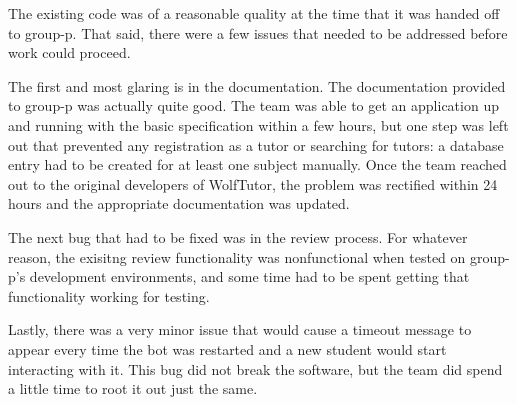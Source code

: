 The existing code was of a reasonable quality at the time that it was handed off
to group-p.  That said, there were a few issues that needed to be addressed
before work could proceed.

The first and most glaring is in the documentation.  The documentation provided
to group-p was actually quite good.  The team was able to get an application up
and running with the basic specification within a few hours, but one step was
left out that prevented any registration as a tutor or searching for tutors: a
database entry had to be created for at least one subject manually.  Once
the team reached out to the original developers of WolfTutor, the problem was
rectified within 24 hours and the appropriate documentation was updated.

The next bug that had to be fixed was in the review process.  For whatever
reason, the exisitng review functionality was nonfunctional when tested on
group-p's development environments, and some time had to be spent getting that
functionality working for testing.

Lastly, there was a very minor issue that would cause a timeout message to
appear every time the bot was restarted and a new student would start
interacting with it.  This bug did not break the software, but the team did
spend a little time to root it out just the same.
